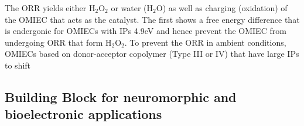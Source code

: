 The ORR yields either H$_{2}$O$_{2}$ or water (H$_{2}$O) as well as charging (oxidation) of the OMIEC that acts as the catalyst. The first shows a free energy difference that is endergonic for OMIECs with IPs \> 4.9eV and hence prevent the OMIEC from undergoing ORR that form H$_{2}$O$_{2}$. To prevent the ORR in ambient conditions, OMIECs based on donor-acceptor copolymer (Type III or IV) that have large IPs to shift
\cite{giovannittiEnergeticControlRedoxActive2020}

\subsection{Building Block for neuromorphic and bioelectronic applications}



